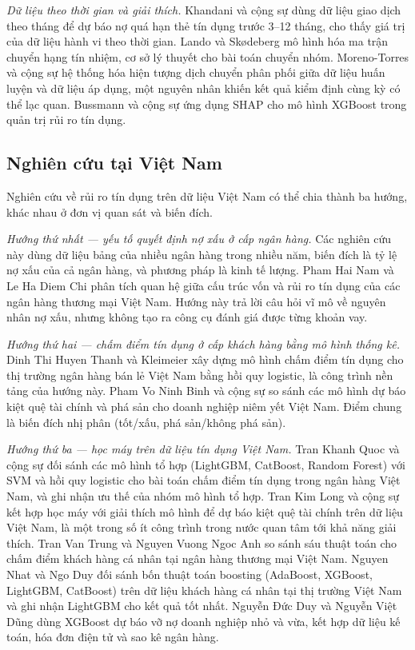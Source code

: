 \noindent\textit{Dữ liệu theo thời gian và giải thích.} Khandani và cộng sự \cite{khandani2010consumer} dùng dữ liệu giao dịch theo tháng để dự báo nợ quá hạn thẻ tín dụng trước 3--12 tháng, cho thấy giá trị của dữ liệu hành vi theo thời gian. Lando và Skødeberg \cite{lando2002analyzing} mô hình hóa ma trận chuyển hạng tín nhiệm, cơ sở lý thuyết cho bài toán chuyển nhóm. Moreno-Torres và cộng sự \cite{morenotorres2012unifying} hệ thống hóa hiện tượng dịch chuyển phân phối giữa dữ liệu huấn luyện và dữ liệu áp dụng, một nguyên nhân khiến kết quả kiểm định cùng kỳ có thể lạc quan. Bussmann và cộng sự \cite{bussmann2021explainable} ứng dụng SHAP cho mô hình XGBoost trong quản trị rủi ro tín dụng.

\subsection{Nghiên cứu tại Việt Nam}
\label{sec:ch1-vietnam}

Nghiên cứu về rủi ro tín dụng trên dữ liệu Việt Nam có thể chia thành ba hướng, khác nhau ở đơn vị quan sát và biến đích.

\noindent\textit{Hướng thứ nhất --- yếu tố quyết định nợ xấu ở cấp ngân hàng.} Các nghiên cứu này dùng dữ liệu bảng của nhiều ngân hàng trong nhiều năm, biến đích là tỷ lệ nợ xấu của cả ngân hàng, và phương pháp là kinh tế lượng. Pham Hai Nam và Le Ha Diem Chi \cite{pham2023creditrisk} phân tích quan hệ giữa cấu trúc vốn và rủi ro tín dụng của các ngân hàng thương mại Việt Nam. Hướng này trả lời câu hỏi vĩ mô về nguyên nhân nợ xấu, nhưng không tạo ra công cụ đánh giá được từng khoản vay.

\noindent\textit{Hướng thứ hai --- chấm điểm tín dụng ở cấp khách hàng bằng mô hình thống kê.} Dinh Thi Huyen Thanh và Kleimeier \cite{dinh2007credit} xây dựng mô hình chấm điểm tín dụng cho thị trường ngân hàng bán lẻ Việt Nam bằng hồi quy logistic, là công trình nền tảng của hướng này. Pham Vo Ninh Binh và cộng sự \cite{pham2018financial} so sánh các mô hình dự báo kiệt quệ tài chính và phá sản cho doanh nghiệp niêm yết Việt Nam. Điểm chung là biến đích nhị phân (tốt/xấu, phá sản/không phá sản).

\noindent\textit{Hướng thứ ba --- học máy trên dữ liệu tín dụng Việt Nam.} Tran Khanh Quoc và cộng sự \cite{tran2021mlcredit} đối sánh các mô hình tổ hợp (LightGBM, CatBoost, Random Forest) với SVM và hồi quy logistic cho bài toán chấm điểm tín dụng trong ngân hàng Việt Nam, và ghi nhận ưu thế của nhóm mô hình tổ hợp. Tran Kim Long và cộng sự \cite{tran2022explainable} kết hợp học máy với giải thích mô hình để dự báo kiệt quệ tài chính trên dữ liệu Việt Nam, là một trong số ít công trình trong nước quan tâm tới khả năng giải thích. Tran Van Trung và Nguyen Vuong Ngoc Anh \cite{trung2024credit} so sánh sáu thuật toán cho chấm điểm khách hàng cá nhân tại ngân hàng thương mại Việt Nam. Nguyen Nhat và Ngo Duy \cite{nguyen2025boosting} đối sánh bốn thuật toán boosting (AdaBoost, XGBoost, LightGBM, CatBoost) trên dữ liệu khách hàng cá nhân tại thị trường Việt Nam và ghi nhận LightGBM cho kết quả tốt nhất. Nguyễn Đức Duy và Nguyễn Việt Dũng \cite{nguyenduy2026sme} dùng XGBoost dự báo vỡ nợ doanh nghiệp nhỏ và vừa, kết hợp dữ liệu kế toán, hóa đơn điện tử và sao kê ngân hàng.


